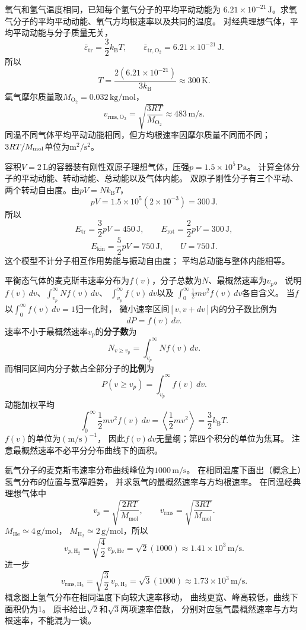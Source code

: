 
\problemtext 氧气和氢气温度相同，已知每个氢气分子的平均平动动能为
$6.21\times10^{-21}\,\mathrm J$。求氧气分子的平均平动动能、氧气方均根速率以及共同的温度。
\workings
对经典理想气体，平均平动动能与分子质量无关，
\[
\bar\varepsilon_{\mathrm{tr}}=\frac32 k_{\mathrm B}T,
\qquad
\boxed{\bar\varepsilon_{\mathrm{tr,O_2}}
=6.21\times10^{-21}\,\mathrm J}.
\]
所以
\[
\boxed{T=\frac{2(6.21\times10^{-21})}{3k_{\mathrm B}}
\approx300\,\mathrm K}.
\]
氧气摩尔质量取$M_{\mathrm{O_2}}=0.032\,\mathrm{kg/mol}$，
\[
\boxed{v_{\mathrm{rms,O_2}}
=\sqrt{\frac{3RT}{M_{\mathrm{O_2}}}}
\approx483\,\mathrm{m/s}}.
\]
\crosscheck 同温不同气体平均平动动能相同，但方均根速率因摩尔质量不同而不同；
$3RT/M_{\rm mol}$单位为$\mathrm{m^2/s^2}$。

\problemtext 容积$V=2\,\mathrm L$的容器装有刚性双原子理想气体，压强$p=1.5\times10^5\,\mathrm{Pa}$。
计算全体分子的平动动能、转动动能、总动能以及气体内能。
\workings
双原子刚性分子有三个平动、两个转动自由度。由$pV=Nk_{\mathrm B}T$，
\[
pV=1.5\times10^5(2\times10^{-3})=300\,\mathrm J.
\]
所以
\[
\boxed{E_{\mathrm{tr}}=\frac32pV=450\,\mathrm J},\qquad
\boxed{E_{\mathrm{rot}}=\frac22pV=300\,\mathrm J},
\]
\[
\boxed{E_{\mathrm{kin}}=\frac52pV=750\,\mathrm J},
\qquad
\boxed{U=750\,\mathrm J}.
\]
\crosscheck 这个模型不计分子相互作用势能与振动自由度；
平均总动能与整体内能相等。

\problemtext 平衡态气体的麦克斯韦速率分布为$f(v)$，分子总数为$N$、最概然速率为$v_p$。
说明$f(v)\,dv$、$\int_{v_p}^\infty Nf(v)\,dv$、
$\int_{v_p}^\infty f(v)\,dv$以及
$\int_0^\infty\tfrac12mv^2f(v)\,dv$各自含义。
\workings
当$f$以$\int_0^\infty f(v)\,dv=1$归一化时，
微小速率区间$[v,v+dv]$内的分子数比例为
\[
\boxed{dP=f(v)\,dv}.
\]
速率不小于最概然速率$v_p$的\textbf{分子数}为
\[
\boxed{N_{v\ge v_p}=\int_{v_p}^\infty Nf(v)\,dv}.
\]
而相同区间内分子数占全部分子的\textbf{比例}为
\[
\boxed{P(v\ge v_p)=\int_{v_p}^\infty f(v)\,dv}.
\]
动能加权平均
\[
\boxed{\int_0^\infty\frac12mv^2 f(v)\,dv
=\left\langle\frac12mv^2\right\rangle
=\frac32k_{\mathrm B}T}.
\]
\crosscheck $f(v)$的单位为$(\mathrm{m/s})^{-1}$，
因此$f(v)dv$无量纲；第四个积分的单位为焦耳。
注意最概然速率不必平分分布曲线下的面积。

\problemtext 氦气分子的麦克斯韦速率分布曲线峰位为$1000\,\mathrm{m/s}$。
在相同温度下画出（概念上）氢气分布的位置与宽窄趋势，
并求氢气的最概然速率与方均根速率。
\workings
在同温经典理想气体中
\[
v_p=\sqrt{\frac{2RT}{M_{\mathrm{mol}}}},\qquad
v_{\mathrm{rms}}=\sqrt{\frac{3RT}{M_{\mathrm{mol}}}}.
\]
$M_{\mathrm{He}}\simeq4\,\mathrm{g/mol}$，
$M_{\mathrm{H_2}}\simeq2\,\mathrm{g/mol}$，所以
\[
\boxed{v_{p,\mathrm{H_2}}
=\sqrt{\frac{4}{2}}\,v_{p,\mathrm{He}}
=\sqrt2(1000)\approx1.41\times10^3\,\mathrm{m/s}}.
\]
进一步
\[
\boxed{v_{\mathrm{rms,H_2}}
=\sqrt{\frac32}\,v_{p,\mathrm{H_2}}
=\sqrt3(1000)\approx1.73\times10^3\,\mathrm{m/s}}.
\]
概念图上氢气分布在相同温度下向较大速率移动，
曲线更宽、峰高较低，曲线下面积仍为1。
\crosscheck 原书给出$\sqrt2$和$\sqrt3$两项速率倍数，
分别对应氢气最概然速率与方均根速率，不能混为一谈。

